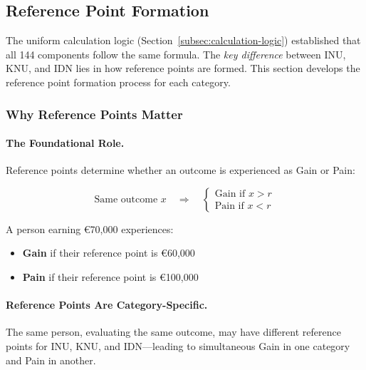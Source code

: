 \subsection{Reference Point Formation}
\label{subsec:reference-points}


The uniform calculation logic (Section~\ref{subsec:calculation-logic}) established 
that all 144 components follow the same formula. The \emph{key difference} between 
INU, KNU, and IDN lies in how reference points are formed. This section develops 
the reference point formation process for each category.

\subsubsection{Why Reference Points Matter}

\paragraph{The Foundational Role.}
Reference points determine whether an outcome is experienced as Gain or Pain:

\begin{equation}
\text{Same outcome } x \quad \Rightarrow \quad 
\begin{cases}
\text{Gain if } x > r \\
\text{Pain if } x < r
\end{cases}
\end{equation}

A person earning \euro{70,000} experiences:
\begin{itemize}
\item \textbf{Gain} if their reference point is \euro{60,000}
\item \textbf{Pain} if their reference point is \euro{100,000}
\end{itemize}

\paragraph{Reference Points Are Category-Specific.}
The same person, evaluating the same outcome, may have different reference 
points for INU, KNU, and IDN---leading to simultaneous Gain in one category 
and Pain in another.

